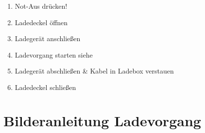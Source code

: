 \begin{enumerate}
    \item Not-Aus drücken!
    \item Ladedeckel öffnen
    \item Ladegerät anschließen
    \item Ladevorgang starten siehe 
    \item Ladegerät abschließen \& Kabel in Ladebox verstauen
    \item Ladedeckel schließen
\end{enumerate}

\section{Bilderanleitung Ladevorgang}